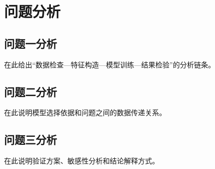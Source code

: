 \section{问题分析}

\subsection{问题一分析}
在此给出“数据检查—特征构造—模型训练—结果检验”的分析链条。

\subsection{问题二分析}
在此说明模型选择依据和问题之间的数据传递关系。

\subsection{问题三分析}
在此说明验证方案、敏感性分析和结论解释方式。
